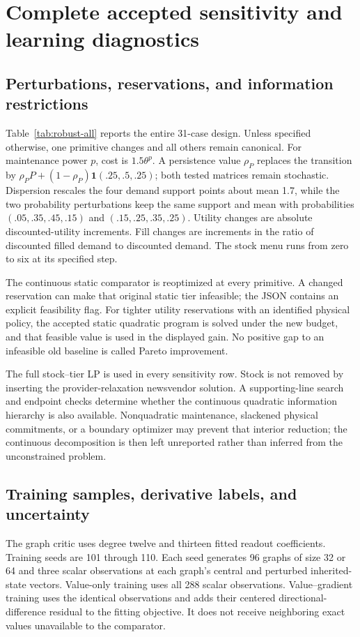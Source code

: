 \section{Complete accepted sensitivity and learning diagnostics}\label{ec:diagnostics}
\subsection{Perturbations, reservations, and information restrictions}
Table~\ref{tab:robust-all} reports the entire 31-case design. Unless specified otherwise, one primitive changes and all others remain canonical. For maintenance power $p$, cost is $1.5\theta^p$. A persistence value $\rho_P$ replaces the transition by $\rho_PP+(1-\rho_P)\mathbf1(.25,.5,.25)$; both tested matrices remain stochastic. Dispersion rescales the four demand support points about mean 1.7, while the two probability perturbations keep the same support and mean with probabilities $(.05,.35,.45,.15)$ and $(.15,.25,.35,.25)$. Utility changes are absolute discounted-utility increments. Fill changes are increments in the ratio of discounted filled demand to discounted demand. The stock menu runs from zero to six at its specified step.

The continuous static comparator is reoptimized at every primitive. A changed reservation can make that original static tier infeasible; the JSON contains an explicit feasibility flag. For tighter utility reservations with an identified physical policy, the accepted static quadratic program is solved under the new budget, and that feasible value is used in the displayed gain. No positive gap to an infeasible old baseline is called Pareto improvement.

The full stock--tier LP is used in every sensitivity row. Stock is not removed by inserting the provider-relaxation newsvendor solution. A supporting-line search and endpoint checks determine whether the continuous quadratic information hierarchy is also available. Nonquadratic maintenance, slackened physical commitments, or a boundary optimizer may prevent that interior reduction; the continuous decomposition is then left unreported rather than inferred from the unconstrained problem.


\subsection{Training samples, derivative labels, and uncertainty}
The graph critic uses degree twelve and thirteen fitted readout coefficients. Training seeds are 101 through 110. Each seed generates 96 graphs of size 32 or 64 and three scalar observations at each graph's central and perturbed inherited-state vectors. Value-only training uses all 288 scalar observations. Value--gradient training uses the identical observations and adds their centered directional-difference residual to the fitting objective. It does not receive neighboring exact values unavailable to the comparator.

